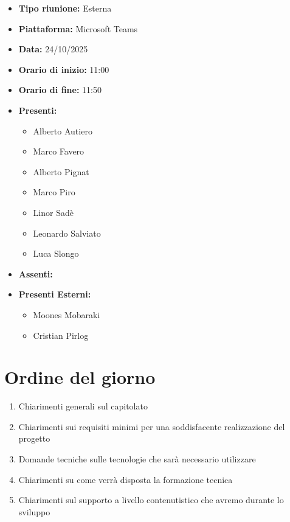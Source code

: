 \documentclass[a4paper,12pt]{article}
\begin{document}
\begin{itemize}
    \item \textbf{Tipo riunione:} Esterna
    \item \textbf{Piattaforma:} Microsoft Teams
    \item \textbf{Data:} 24/10/2025
    \item \textbf{Orario di inizio:} 11:00
    \item \textbf{Orario di fine:} 11:50
    \item \textbf{Presenti:}
    \begin{itemize}[leftmargin=1.5em, itemsep=3pt, label={\rule[0.5ex]{0.4em}{0.4em}}]
        \item Alberto Autiero
        \item Marco Favero
        \item Alberto Pignat
        \item Marco Piro
        \item Linor Sadè
        \item Leonardo Salviato
        \item Luca Slongo
    \end{itemize}
    \item \textbf{Assenti:}
    \item \textbf{Presenti Esterni:}
    \begin{itemize}[leftmargin=1.5em, itemsep=3pt, label={\rule[0.5ex]{0.4em}{0.4em}}]
        \item Moones Mobaraki
        \item Cristian Pirlog
    \end{itemize}

\end{itemize}

\section{Ordine del giorno}

\begin{enumerate}
    \item Chiarimenti generali sul capitolato
    \item Chiarimenti sui requisiti minimi per una soddisfacente realizzazione del progetto
    \item Domande tecniche sulle tecnologie che sarà necessario utilizzare
    \item Chiarimenti su come verrà disposta la formazione tecnica
    \item Chiarimenti sul supporto a livello contenutistico che avremo durante lo sviluppo
\end{enumerate}
\end{document}
